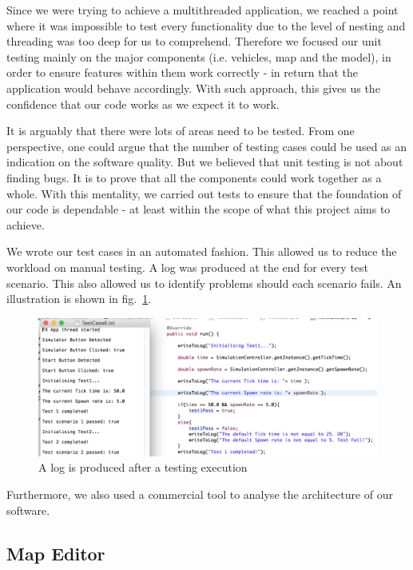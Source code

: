 Since we were trying to achieve a multithreaded application, we reached a point where it was impossible to test every functionality due to the level of nesting and threading was too deep for us to comprehend. Therefore we focused our unit testing mainly on the major components (i.e. vehicles, map and the model), in order to ensure features within them work correctly - in return that the application would behave accordingly. With such approach, this gives us the confidence that our code works as we expect it to work. 

It is arguably that there were lots of areas need to be tested. From one perspective, one could argue that the number of testing cases could be used as an indication on the software quality. But we believed that unit testing is not about finding bugs. It is to prove that all the components could work together as a whole.  With this mentality, we carried out tests to ensure that the foundation of our code is dependable - at least within the scope of what this project aims to achieve.  

We wrote our test cases in an automated fashion. This allowed us to reduce the workload on manual testing.  A log was produced at the end for every test scenario. This also allowed us to identify problems should each scenario fails. An illustration is shown in fig.~\ref{fig:testingCase}. 

\begin{figure}[h]
	\begin{center}
		\includegraphics[width=\textwidth]{img/testingCase.png}
		\caption{A log is produced after a testing execution}
		\label{fig:testingCase}
	\end{center}
\end{figure}

Furthermore, we also used a commercial tool to analyse the architecture of our software.  

\subsection{Map Editor}

